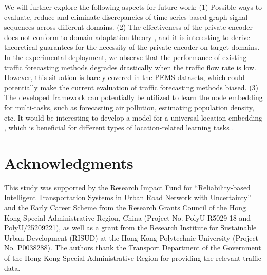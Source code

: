 \documentclass[sigconf]{acmart}
\theoremstyle{definition}
\begin{document}
We will further explore the following aspects for future work: (1) Possible ways to evaluate, reduce and eliminate discrepancies of time-series-based graph signal sequences across different domains. (2) The effectiveness of the private encoder does not conform to domain adaptation theory \cite{ben2010theory}, and it is interesting to derive theoretical guarantees for the necessity of the private encoder on target domains.
In the experimental deployment, we observe that the performance of existing traffic forecasting methods degrades drastically when the traffic flow rate is low. However, this situation is barely covered in the PEMS datasets, which could potentially make the current evaluation of traffic forecasting methods biased. (3) The developed framework can potentially be utilized to learn the node embedding for multi-tasks, such as forecasting air pollution, estimating population density, etc. It would be interesting to develop a model for a universal location embedding \cite{bommasani2021opportunities}, which is beneficial for different types of location-related learning tasks \cite{wu2020learning, chen2021robust}.




\section*{Acknowledgments}
This study was supported by the Research Impact Fund for ``Reliability-based Intelligent Transportation Systems in Urban Road Network with Uncertainty'' and the Early Career Scheme from the Research Grants Council of the Hong Kong Special Administrative Region, China (Project No. PolyU R5029-18 and PolyU/25209221), as well as a grant from the Research Institute for Sustainable Urban Development (RISUD) at the Hong Kong Polytechnic University (Project No. P0038288). The authors thank the Transport Department of the Government of the Hong Kong Special Administrative Region for providing the relevant traffic data.







\clearpage


\balance

\end{document}
